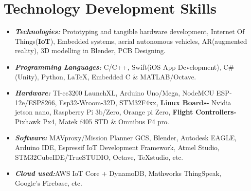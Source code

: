 \documentclass[10pt]{report}
\begin{document}
\section*{\color{BlueViolet}\faSellsy\hspace{1pt} Technology Development Skills}
\begin{itemize}
\vspace{-1em}\item \textbf{\emph{Technologies:}} Prototyping and tangible hardware development, Internet Of Things(\textbf{IoT}), Embedded systems, aerial autonomous vehicles, AR(augmented reality), 3D modelling in Blender, PCB Designing. 
\item\textbf{\emph{Programming Languages:}} C/C++, Swift(iOS App Development), C#(Unity), Python, \LaTeX, Embedded C   \& MATLAB/Octave.
\item\textbf{\emph{Hardware:}} TI-cc3200 LaunchXL, Arduino Uno/Mega, NodeMCU ESP-12e/ESP8266, Esp32-Wroom-32D, STM32F4xx,\textbf{ Linux Boards-} Nvidia jetson nano, Raspberry Pi 3b/Zero, Orange pi Zero,\textbf{ Flight Controllers-} Pixhawk Px4, Matek f405 STD \& Omnibus F4 pro.
\item\textbf{\emph{Software:}} MAVproxy/Mission Planner GCS, Blender, Autodesk EAGLE, Arduino IDE, Espressif IoT Development Framework, Atmel Studio, STM32CubeIDE/TrueSTUDIO, Octave, TeXstudio, etc.
\item\textbf{\emph{Cloud used:}}AWS IoT Core + DynamoDB, Mathworks ThingSpeak, Google's Firebase, etc.\vspace{-1em}
\end{itemize}
\end{document}
